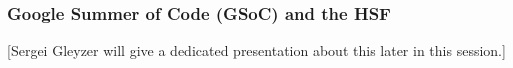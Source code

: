 \begin{frame}
\frametitle{Google Summer of Code (GSoC) and the HSF}

  [Sergei Gleyzer will give a dedicated presentation about this later in this session.]

\end{frame}


